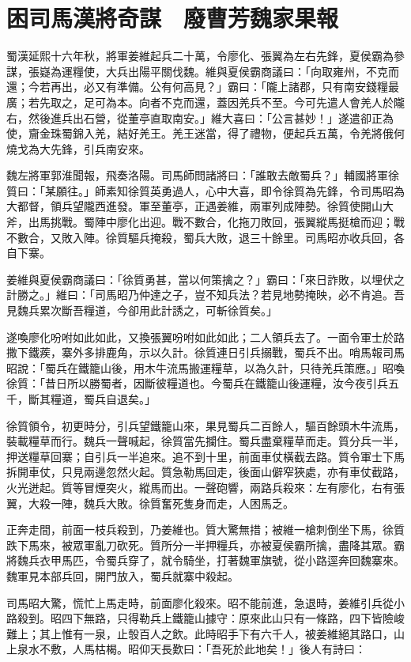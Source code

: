 
\chapter{困司馬漢將奇謀　廢曹芳魏家果報}

蜀漢延熙十六年秋，將軍姜維起兵二十萬，令廖化、張翼為左右先鋒，夏侯霸為參謀，張嶷為運糧使，大兵出陽平關伐魏。維與夏侯霸商議曰：「向取雍州，不克而還；今若再出，必又有準備。公有何高見？」霸曰：「隴上諸郡，只有南安錢糧最廣；若先取之，足可為本。向者不克而還，蓋因羌兵不至。今可先遣人會羌人於隴右，然後進兵出石營，從董亭直取南安。」維大喜曰：「公言甚妙！」遂遣卻正為使，齎金珠蜀錦入羌，結好羌王。羌王迷當，得了禮物，便起兵五萬，令羌將俄何燒戈為大先鋒，引兵南安來。

魏左將軍郭淮聞報，飛奏洛陽。司馬師問諸將曰：「誰敢去敵蜀兵？」輔國將軍徐質曰：「某願往。」師素知徐質英勇過人，心中大喜，即令徐質為先鋒，令司馬昭為大都督，領兵望隴西進發。軍至董亭，正遇姜維，兩軍列成陣勢。徐質使開山大斧，出馬挑戰。蜀陣中廖化出迎。戰不數合，化拖刀敗回，張翼縱馬挺槍而迎；戰不數合，又敗入陣。徐質驅兵掩殺，蜀兵大敗，退三十餘里。司馬昭亦收兵回，各自下寨。

姜維與夏侯霸商議曰：「徐質勇甚，當以何策擒之？」霸曰：「來日詐敗，以埋伏之計勝之。」維曰：「司馬昭乃仲達之子，豈不知兵法？若見地勢掩映，必不肯追。吾見魏兵累次斷吾糧道，今卻用此計誘之，可斬徐質矣。」

遂喚廖化吩咐如此如此，又換張翼吩咐如此如此；二人領兵去了。一面令軍士於路撒下鐵蒺，寨外多排鹿角，示以久計。徐質連日引兵搦戰，蜀兵不出。哨馬報司馬昭說：「蜀兵在鐵籠山後，用木牛流馬搬運糧草，以為久計，只待羌兵策應。」昭喚徐質：「昔日所以勝蜀者，因斷彼糧道也。今蜀兵在鐵籠山後運糧，汝今夜引兵五千，斷其糧道，蜀兵自退矣。」

徐質領令，初更時分，引兵望鐵籠山來，果見蜀兵二百餘人，驅百餘頭木牛流馬，裝載糧草而行。魏兵一聲喊起，徐質當先攔住。蜀兵盡棄糧草而走。質分兵一半，押送糧草回寨；自引兵一半追來。追不到十里，前面車仗橫截去路。質令軍士下馬拆開車仗，只見兩邊忽然火起。質急勒馬回走，後面山僻窄狹處，亦有車仗截路，火光迸起。質等冒煙突火，縱馬而出。一聲砲響，兩路兵殺來：左有廖化，右有張翼，大殺一陣，魏兵大敗。徐質奮死隻身而走，人困馬乏。

正奔走間，前面一枝兵殺到，乃姜維也。質大驚無措；被維一槍刺倒坐下馬，徐質跌下馬來，被眾軍亂刀砍死。質所分一半押糧兵，亦被夏侯霸所擒，盡降其眾。霸將魏兵衣甲馬匹，令蜀兵穿了，就令騎坐，打著魏軍旗號，從小路逕奔回魏寨來。魏軍見本部兵回，開門放入，蜀兵就寨中殺起。

司馬昭大驚，慌忙上馬走時，前面廖化殺來。昭不能前進，急退時，姜維引兵從小路殺到。昭四下無路，只得勒兵上鐵籠山據守：原來此山只有一條路，四下皆險峻難上；其上惟有一泉，止彀百人之飲。此時昭手下有六千人，被姜維絕其路口，山上泉水不敷，人馬枯楬。昭仰天長歎曰：「吾死於此地矣！」後人有詩曰：


